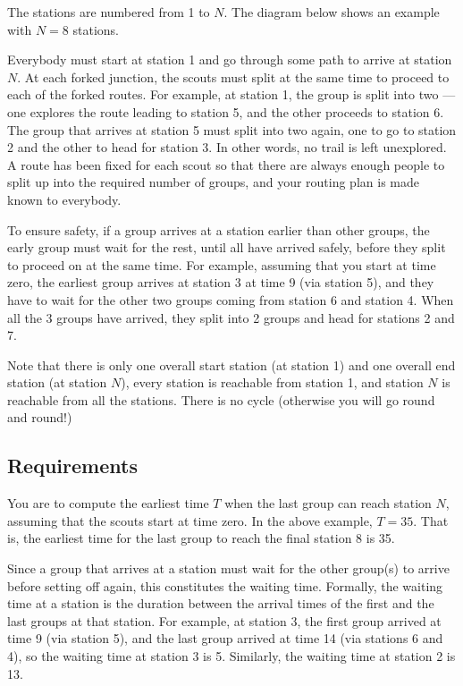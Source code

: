 The stations are numbered from 1 to $N$.
The diagram below shows an example with $N = 8$ stations.

\begin{center}
\end{center}

Everybody must start at station 1 and go through some path to arrive at
station $N$.
At each forked junction,
the scouts must split at the same
time to proceed to each of the forked routes.  For example, at station
1, the group is split into two --- one explores the route leading to
station 5, and the other proceeds to station 6.  The group that arrives
at station 5 must split into two again, one to go to station 2 and the
other to head for station 3.  In other words, no trail is left
unexplored.
A route has been fixed for each scout so that there are always
enough people to split up into the required number of groups,
and your routing plan is made known to everybody.

To ensure safety,
if a group arrives at a station earlier than other groups,
the early group must wait for the rest, until all have arrived
safely, before they split to proceed on at the same time.  
For example,
assuming that you start at time zero,
the earliest group
arrives at station 3 at time 9 (via station 5), and they have to wait
for the other two groups coming from station 6 and station 4.  When all
the 3 groups have arrived, they split into 2 groups and head for
stations 2 and 7.

Note that there is only one overall start station (at
station 1) and one overall end station (at station $N$),
every station is reachable from station 1,
and station $N$ is reachable from all the stations.
There is no cycle (otherwise you will go round and round!)

\subsection{Requirements}

You are to compute the earliest time $T$ when the last group can reach
station $N$,
assuming that the scouts start at time zero.
In the above example,
$T = 35$.
That is,
the earliest time for the last group to reach the final station 8 is 35.

Since a group that arrives at a station must wait for the other group(s)
to arrive before setting off again, this constitutes the waiting time. 
Formally, the waiting time at a station
is the duration between the arrival times of the first and the last groups
at that station.
For example, at station 3, the first group arrived at time 9
(via station 5), and the last group arrived at time 14 (via stations 6
and 4), so the waiting time at station 3 is 5.  Similarly, the waiting
time at station 2 is 13. 


